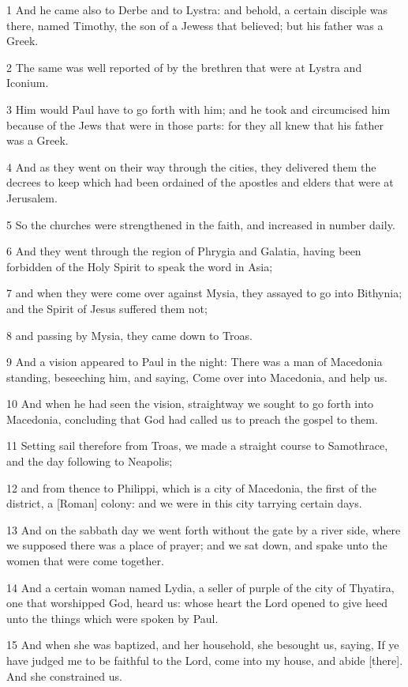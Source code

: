 \par 1 And he came also to Derbe and to Lystra: and behold, a certain disciple was there, named Timothy, the son of a Jewess that believed; but his father was a Greek.
\par 2 The same was well reported of by the brethren that were at Lystra and Iconium.
\par 3 Him would Paul have to go forth with him; and he took and circumcised him because of the Jews that were in those parts: for they all knew that his father was a Greek.
\par 4 And as they went on their way through the cities, they delivered them the decrees to keep which had been ordained of the apostles and elders that were at Jerusalem.
\par 5 So the churches were strengthened in the faith, and increased in number daily.
\par 6 And they went through the region of Phrygia and Galatia, having been forbidden of the Holy Spirit to speak the word in Asia;
\par 7 and when they were come over against Mysia, they assayed to go into Bithynia; and the Spirit of Jesus suffered them not;
\par 8 and passing by Mysia, they came down to Troas.
\par 9 And a vision appeared to Paul in the night: There was a man of Macedonia standing, beseeching him, and saying, Come over into Macedonia, and help us.
\par 10 And when he had seen the vision, straightway we sought to go forth into Macedonia, concluding that God had called us to preach the gospel to them.
\par 11 Setting sail therefore from Troas, we made a straight course to Samothrace, and the day following to Neapolis;
\par 12 and from thence to Philippi, which is a city of Macedonia, the first of the district, a [Roman] colony: and we were in this city tarrying certain days.
\par 13 And on the sabbath day we went forth without the gate by a river side, where we supposed there was a place of prayer; and we sat down, and spake unto the women that were come together.
\par 14 And a certain woman named Lydia, a seller of purple of the city of Thyatira, one that worshipped God, heard us: whose heart the Lord opened to give heed unto the things which were spoken by Paul.
\par 15 And when she was baptized, and her household, she besought us, saying, If ye have judged me to be faithful to the Lord, come into my house, and abide [there]. And she constrained us.
